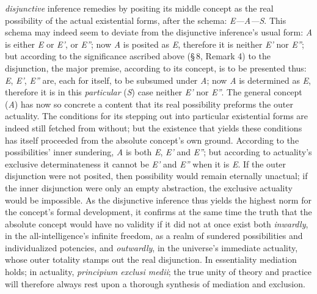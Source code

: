 \documentclass[12pt]{book}
\begin{document}
\emph{disjunctive} inference remedies by positing its middle concept as the
real possibility of the actual existential forms, after the schema:
\textit{E---A---S}. This schema may indeed seem to deviate from the
disjunctive inference's usual form: \textit{A} is either \textit{E} or
\textit{E'}, or \textit{E''}; now \textit{A} is posited as \textit{E},
therefore it is neither \textit{E'} nor \textit{E''}; but according to the
significance ascribed above (\S\,8, Remark 4) to the disjunction, the major
premise, according to its concept, is to be presented thus: \textit{E},
\textit{E'}, \textit{E''} are, each for itself, to be subsumed under
\textit{A}; now \textit{A} is determined as \textit{E}, therefore it is in
this \emph{particular} (\textit{S}) case neither \textit{E'} nor
\textit{E''}. The general concept (\textit{A}) has now so concrete a content
that its real possibility preforms the outer actuality. The conditions for
its stepping out into particular existential forms are indeed still fetched
from without; but the existence that yields these conditions has itself
proceeded from the absolute concept's own ground. According to the
possibilities' inner sundering, \textit{A} is both \textit{E}, \textit{E'}
and \textit{E''}; but according to actuality's exclusive determinateness it
cannot be \textit{E'} and \textit{E''} when it is \textit{E}. If the outer
disjunction were not posited, then possibility would remain eternally
unactual; if the inner disjunction were only an empty abstraction, the
exclusive actuality would be impossible. As the disjunctive inference thus
yields the highest norm for the concept's formal development, it confirms at
the same time the truth that the absolute concept would have no validity if
it did not at once exist both \emph{inwardly}, in the all-intelligence's
infinite freedom, as a realm of sundered possibilities and individualized
potencies, and \emph{outwardly}, in the universe's immediate actuality,
whose outer totality stamps out the real disjunction. In essentiality
mediation holds; in actuality, \textit{principium exclusi medii}; the true
unity of theory and practice will therefore always rest upon a thorough
synthesis of mediation and exclusion.
\end{document}
